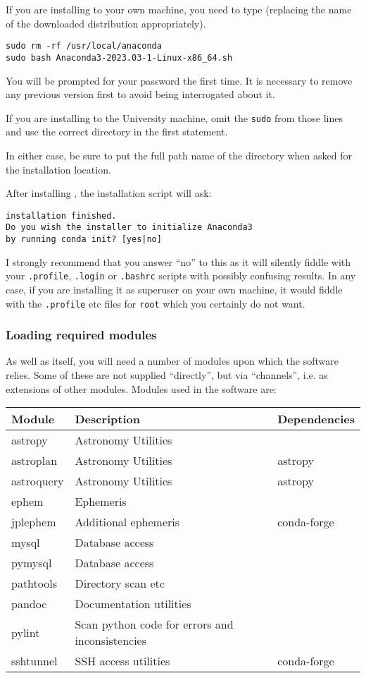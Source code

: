 If you are installing to your own machine, you need to type (replacing the name
of the {\anac} downloaded distribution appropriately).

\begin{verbatim}
sudo rm -rf /usr/local/anaconda
sudo bash Anaconda3-2023.03-1-Linux-x86_64.sh
\end{verbatim}

You will be prompted for your password the first time. It is necessary to remove
any previous version first to avoid being interrogated about it.

If you are installing to the University machine, omit the \texttt{sudo} from
those lines and use the correct directory in the first statement.

In either case, be sure to put the full path name of the directory when asked
for the installation location.

After installing \anac, the installation script will ask:

\begin{verbatim}
installation finished.
Do you wish the installer to initialize Anaconda3
by running conda init? [yes|no]
\end{verbatim}

I strongly recommend that you answer ``no'' to this as it will silently fiddle
with your \texttt{.profile}, \texttt{.login} or \texttt{.bashrc} scripts with
possibly confusing results. In any case, if you are installing it as superuser
on your own machine, it would fiddle with the \texttt{.profile} etc files for
\texttt{root} which you certainly do not want.

\subsubsection{Loading required {\py} modules}
\protect\label{section:pymodules}

As well as {\py} itself, you will need a number of modules upon which the
software relies. Some of these are not supplied ``directly'', but via
``channels'', i.e. as extensions of other modules. Modules used in the software
are:

\begin{tabular}{lll}
Module&Description&Dependencies\\\hline
astropy&Astronomy Utilities\\
astroplan&Astronomy Utilities&astropy\\
astroquery&Astronomy Utilities&astropy\\
ephem&Ephemeris\\
jplephem&Additional ephemeris&conda-forge\\
mysql&Database access\\
pymysql&Database access\\
pathtools&Directory scan etc\\
pandoc&Documentation utilities\\
pylint&Scan python code for errors and inconsistencies\\
sshtunnel&SSH access utilities&conda-forge\\\hline
\end{tabular}


